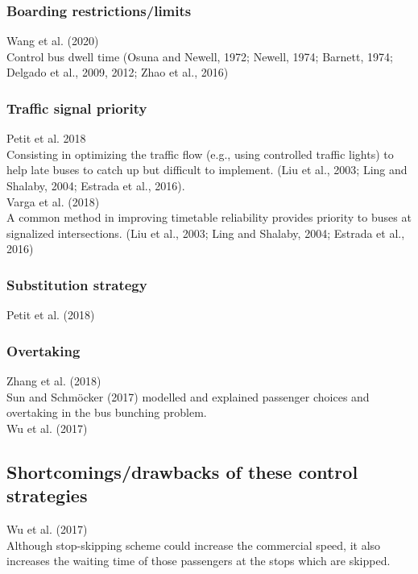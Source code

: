 \documentclass{article}
\begin{document}
\subsubsection*{Boarding restrictions/limits}
\noindent \textrm{Wang et al. (2020)}\\
Control bus dwell time
\textrm{(Osuna and Newell, 1972; Newell, 1974; Barnett, 1974; Delgado et al., 2009, 2012; Zhao et al., 2016)}\\

\subsubsection*{Traffic signal priority}
\noindent \textrm{Petit et al. 2018}\\
Consisting in optimizing the traffic flow 
(e.g., using controlled traffic lights) 
to help late buses to catch up 
but difficult to implement.
\textrm{(Liu et al., 2003; Ling and Shalaby, 2004; Estrada et al., 2016)}.\\

\noindent \textrm{Varga et al. (2018)}\\
A common method in improving timetable reliability provides priority to buses at signalized intersections.
\textrm{(Liu et al., 2003; Ling and Shalaby, 2004; Estrada et al., 2016)}\\

\subsubsection*{Substitution strategy}
\noindent \textrm{Petit et al. (2018)}\\

\subsubsection*{Overtaking}
\noindent \textrm{Zhang et al. (2018)}\\
\textrm{Sun and Schmöcker (2017)} modelled and explained passenger choices and overtaking
in the bus bunching problem.\\

\noindent \textrm{Wu et al. (2017)}\\


\subsection*{Shortcomings/drawbacks of these control strategies}
\noindent \textrm{Wu et al. (2017)}\\
Although stop-skipping scheme could increase the commercial speed, 
it also increases the waiting time of those passengers at the stops which are skipped.\\
\end{document}
